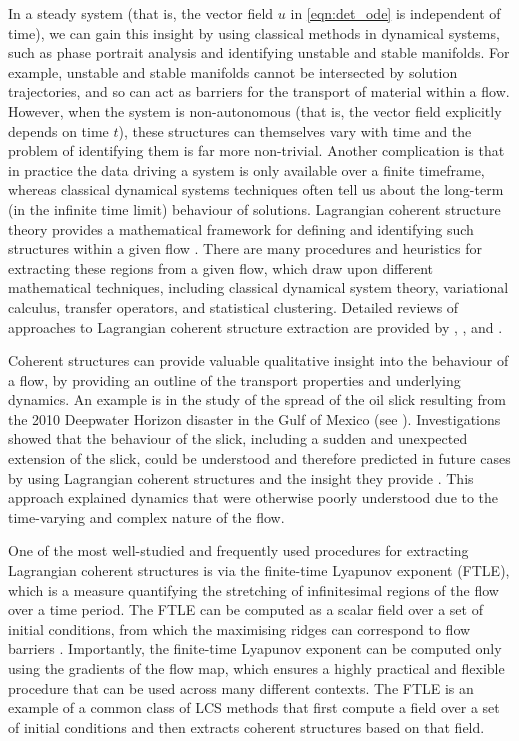 In a steady system (that is, the vector field \(u\) in \cref{eqn:det_ode} is independent of time), we can gain this insight by using classical methods in dynamical systems, such as phase portrait analysis and identifying unstable and stable manifolds.
For example, unstable and stable manifolds cannot be intersected by solution trajectories, and so can act as barriers for the transport of material within a flow.
However, when the system is non-autonomous (that is, the vector field explicitly depends on time \(t\)), these structures can themselves vary with time and the problem of identifying them is far more non-trivial.
Another complication is that in practice the data driving a system is only available over a finite timeframe, whereas classical dynamical systems techniques often tell us about the long-term (in the infinite time limit) behaviour of solutions.
Lagrangian coherent structure theory provides a mathematical framework for defining and identifying such structures within a given flow \citep{BalasuriyaEtAl_2018_GeneralizedLagrangianCoherent}.
There are many procedures and heuristics for extracting these regions from a given flow, which draw upon different mathematical techniques, including classical dynamical system theory, variational calculus, transfer operators, and statistical clustering.
Detailed reviews of approaches to Lagrangian coherent structure extraction are provided by \citet{PeacockDabiri_2010_IntroductionFocusIssue}, \citet{HadjighasemEtAl_2017_CriticalComparisonLagrangian}, and \citet{BalasuriyaEtAl_2018_GeneralizedLagrangianCoherent}.

Coherent structures can provide valuable qualitative insight into the behaviour of a flow, by providing an outline of the transport properties and underlying dynamics.
An example is in the study of the spread of the oil slick resulting from the 2010 Deepwater Horizon disaster in the Gulf of Mexico (see ).
Investigations showed that the behaviour of the slick, including a sudden and unexpected extension of the slick, could be understood and therefore predicted in future cases by using Lagrangian coherent structures and the insight they provide \citep{OlascoagaEtAl_2013_DrifterMotionGulf,OlascoagaHaller_2012_ForecastingSuddenChanges,MezicEtAl_2010_NewMixingDiagnostic}.
This approach explained dynamics that were otherwise poorly understood due to the time-varying and complex nature of the flow.

One of the most well-studied and frequently used procedures for extracting Lagrangian coherent structures is via the finite-time Lyapunov exponent (FTLE), which is a measure quantifying the stretching of infinitesimal regions of the flow over a time period.
The FTLE can be computed as a scalar field over a set of initial conditions, from which the maximising ridges can correspond to flow barriers \citep{ShaddenEtAl_2005_DefinitionPropertiesLagrangian}.
Importantly, the finite-time Lyapunov exponent can be computed only using the gradients of the flow map, which ensures a highly practical and flexible procedure that can be used across many different contexts.
The FTLE is an example of a common class of LCS methods that first compute a field over a set of initial conditions and then extracts coherent structures based on that field.

